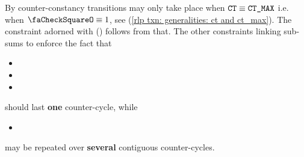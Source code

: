 \saNote{}
By counter-constancy transitions may only take place when $\texttt{CT} \equiv \texttt{CT\_MAX}$ i.e. when $\done \equiv 1$, see (\ref{rlp txn: generalities: ct and ct_max}).
The constraint adorned with (\sanityCheck) follows from that.
The other constraints linking sub-sums to \done{} enforce the fact that
\begin{itemize}
    \item \rlpTxnSharedColumnIsPrefixOfAccessListItem {}
    \item \rlpTxnSharedColumnIsAccessListAddress      {}
    \item \rlpTxnSharedColumnIsPrefixOfStorageKeyList {}
\end{itemize}
should last \textbf{one} counter-cycle, while
\begin{itemize}
    \item \rlpTxnSharedColumnIsAccessListStorageKey {}
\end{itemize}
may be repeated over \textbf{several} contiguous counter-cycles.
